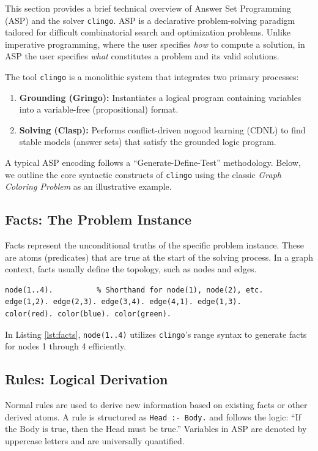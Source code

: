 This section provides a brief technical overview of Answer Set Programming (ASP) and the solver \texttt{clingo}. ASP is a declarative problem-solving paradigm tailored for difficult combinatorial search and optimization problems. Unlike imperative programming, where the user specifies \textit{how} to compute a solution, in ASP the user specifies \textit{what} constitutes a problem and its valid solutions.

The tool \texttt{clingo} is a monolithic system that integrates two primary processes:
\begin{enumerate}
    \item \textbf{Grounding (Gringo):} Instantiates a logical program containing variables into a variable-free (propositional) format.
    \item \textbf{Solving (Clasp):} Performs conflict-driven nogood learning (CDNL) to find stable models (answer sets) that satisfy the grounded logic program.
\end{enumerate}

A typical ASP encoding follows a ``Generate-Define-Test'' methodology. Below, we outline the core syntactic constructs of \texttt{clingo} using the classic \textit{Graph Coloring Problem} as an illustrative example.

\subsection{Facts: The Problem Instance}
Facts represent the unconditional truths of the specific problem instance. These are atoms (predicates) that are true at the start of the solving process. In a graph context, facts usually define the topology, such as nodes and edges.

\begin{lstlisting}[caption={Defining a graph instance and available colors.}, label={lst:facts}]
node(1..4).          % Shorthand for node(1), node(2), etc.
edge(1,2). edge(2,3). edge(3,4). edge(4,1). edge(1,3).
color(red). color(blue). color(green).
\end{lstlisting}

In Listing \ref{lst:facts}, \texttt{node(1..4)} utilizes \texttt{clingo}'s range syntax to generate facts for nodes 1 through 4 efficiently.

\subsection{Rules: Logical Derivation}
Normal rules are used to derive new information based on existing facts or other derived atoms. A rule is structured as \texttt{Head :- Body.} and follows the logic: ``If the Body is true, then the Head must be true.'' Variables in ASP are denoted by uppercase letters and are universally quantified.

